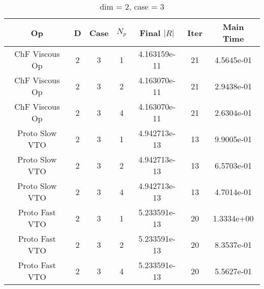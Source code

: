 \documentclass{article}
\begin{document}
\begin{small} 
  \begin{table} [p]
    \begin{center}
      \begin{tabular}{|c|c|c|c|c|c||c|} \hline
        Op & D & Case & $N_p$ & Final $|R|$  &  Iter & Main Time \\
        \hline
        ChF Viscous Op & 2 & 3 & 1& 4.163159e-11 & 21 & 4.5645e-01\\
        ChF Viscous Op & 2 & 3 & 2& 4.163070e-11 & 21 & 2.9438e-01\\
        ChF Viscous Op & 2 & 3 & 4& 4.163070e-11 & 21 & 2.6304e-01\\
        Proto Slow VTO & 2 & 3 & 1& 4.942713e-13 & 13 & 9.9005e-01\\
        Proto Slow VTO & 2 & 3 & 2& 4.942713e-13 & 13 & 6.5703e-01\\
        Proto Slow VTO & 2 & 3 & 4& 4.942713e-13 & 13 & 4.7014e-01\\
        Proto Fast VTO & 2 & 3 & 1& 5.233591e-13 & 20 & 1.3334e+00\\
        Proto Fast VTO & 2 & 3 & 2& 5.233591e-13 & 20 & 8.3537e-01\\
        Proto Fast VTO & 2 & 3 & 4& 5.233591e-13 & 20 & 5.5627e-01\\

        \hline
      \end{tabular} 
    \end{center}   
    \label{__dim_=_2__case_=_3} 
    \caption{dim = 2, case = 3} 
  \end{table} 
\end{small}
\end{document}
